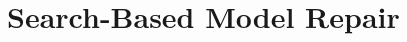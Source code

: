 \documentclass[letterpaper]{article} %
\newcommand{\sbirds}{Science Birds\xspace} %
\newcommand{\hydra}{\textsc{Hydra}\xspace} %
\begin{document}





\section{Search-Based Model Repair}


\end{document}
